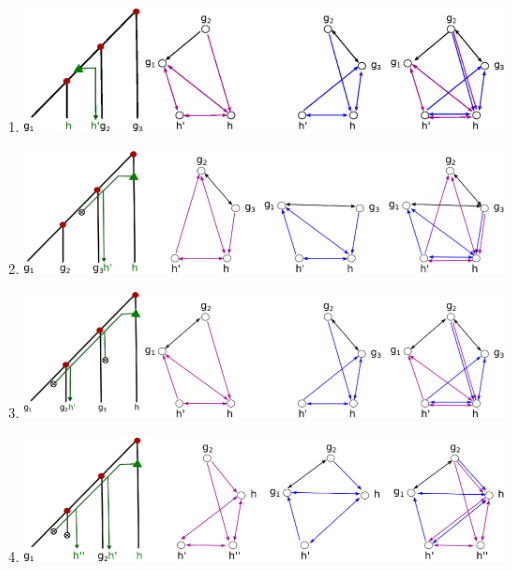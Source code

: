 \documentclass[10pt,a4paper,notitlepage]{article}
\begin{document}
\begin{enumerate}
\item
		\includegraphics[scale=0.7]{Images/eps/fig5}\\
\item
		\includegraphics[scale=0.7]{Images/eps/fig6}\\
\item
		\includegraphics[scale=0.7]{Images/eps/fig7} \\
\item
		\includegraphics[scale=0.7]{Images/eps/fig8} \\

\end{enumerate}


	
\end{document}
